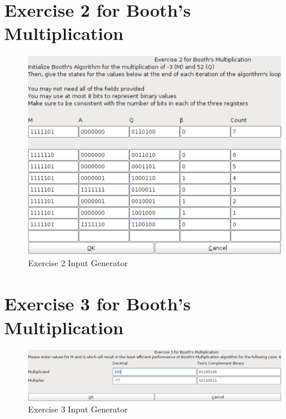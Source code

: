 \documentclass{article}
\begin{document}
\section{Exercise 2 for Booth's Multiplication}
\begin{figure}[h]
\centering
\includegraphics[scale=0.4]{ex2ingen.pdf}
\caption{Exercise 2 Input Generator}
\end{figure}

\pagebreak

\section{Exercise 3 for Booth's Multiplication}
\begin{figure}[h]
\centering
\includegraphics[scale=0.4]{ex3ingen.pdf}
\caption{Exercise 3 Input Generator}
\end{figure}
\end{document}
